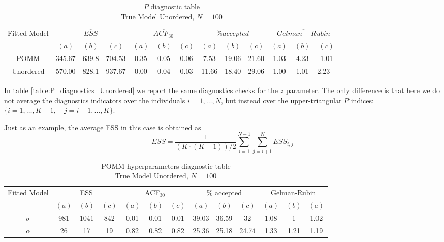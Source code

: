 \documentclass[11pt]{amsart}
\begin{document}
\begin{table}[h]
\centering
\caption{
{\large $P$ diagnostic table} \\ 
{\small True Model Unordered, $N=100$}
} 
\begin{tabular}{ccccccccccccc}
\toprule
\multirow{2}{*}{Fitted Model} & \multicolumn{3}{c}{$\overline{ESS}$} & \multicolumn{3}{c}{
$\overline{ACF_{30}}$} & \multicolumn{3}{c}{$\overline{\% accepted}$} & \multicolumn{3}{c}{$\overline{Gelman-Rubin}$}\\
\cmidrule(lr){2-4} \cmidrule(lr){5-7} \cmidrule(lr){8-10} \cmidrule(lr){11-13} 
& $(a)$ & $(b)$ & $(c)$ & $(a)$ & $(b)$ & $(c)$ & $(a)$ & $(b)$ & $(c)$ & $(a)$ & $(b)$ & $(c)$ \\
\midrule
POMM &345.67 & 639.8 & 704.53 & 0.35 & 0.05 & 0.06 & 7.53 & 19.06 & 21.60 & 1.03 & 4.23 & 1.01  \\
Unordered &570.00 & 828.1 & 937.67 & 0.00 & 0.04 & 0.03 & 11.66 & 18.40 & 29.06 & 1.00 & 1.01 & 2.23 \ \\
\bottomrule
\end{tabular}
\label{table:P_diagnostics_Unordered}
\end{table}


In table \eqref{table:P_diagnostics_Unordered} we report the same diagnostics checks for the $z$ parameter. The only difference is that here we do not average the diagnostics indicators over the individuals $i= 1,\ldots,N$, but instead over the upper-triangular $P$ indices: $\{ i =1,\ldots, K-1, \quad j = i+1, \ldots, K \}$.

Just as an example, the average ESS in this case is obtained as
$$
\overline{ESS} = \frac{1}{(K \cdot (K-1))/2} \sum_{i=1}^{N-1} \sum_{j=i+1}^N ESS_{i,j}
$$




\begin{table}[h]
\centering
\caption{
{\large POMM hyperparameters diagnostic table} \\ 
{\small True Model Unordered, $N=100$}
} 
\begin{tabular}{ccccccccccccc}
\toprule
\multirow{2}{*}{Fitted Model} & \multicolumn{3}{c}{ESS} & \multicolumn{3}{c}{
ACF$_{30}$} & \multicolumn{3}{c}{$\%$ accepted} & \multicolumn{3}{c}{Gelman-Rubin}\\
\cmidrule(lr){2-4} \cmidrule(lr){5-7} \cmidrule(lr){8-10} \cmidrule(lr){11-13} 
& $(a)$ & $(b)$ & $(c)$ & $(a)$ & $(b)$ & $(c)$ & $(a)$ & $(b)$ & $(c)$ & $(a)$ & $(b)$ & $(c)$ \\
\midrule
$\sigma$ &981 & 1041 & 842 & 0.01 & 0.01 & 0.01 & 39.03 & 36.59 & 32 & 1.08 & 1 & 1.02  \\
$\alpha$ &26 & 17 & 19 & 0.82 & 0.82 & 0.82 & 25.36 & 25.18 & 24.74 & 1.33 & 1.21 & 1.19 \\
\bottomrule
\end{tabular}
\label{table:P_hyper_Unordered}
\end{table}
\end{document}
